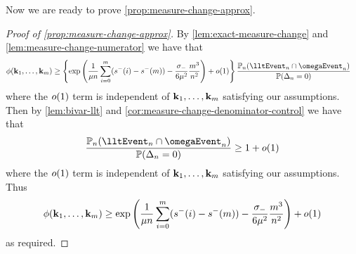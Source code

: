 Now we are ready to prove \cref{prop:measure-change-approx}.

\begin{proof}[Proof of \cref{prop:measure-change-approx}]
    By \cref{lem:exact-measure-change} and \cref{lem:measure-change-numerator} we have that
    \begin{align*}
        \phi(\vk_1, \ldots, \vk_m)
        &\geq \left\{ \exp\left(
            \frac{1}{\mu n} \sum_{i=0}^m (s^-(i) - s^-(m)) - \frac{\sigma_-}{6 \mu^2} \frac{m^3}{n^2}
        \right) + \littleo(1) \right\} \frac{\P_n(\lltEvent_n \cap \omegaEvent_n)}{\P(\Delta_n = 0)}
    \end{align*}
    where the $o(1)$ term is independent of ${\mathbf k}_1, \ldots, {\mathbf k}_m$ satisfying our assumptions. Then by \cref{lem:bivar-llt} and \cref{cor:measure-change-denominator-control} we have that
    \begin{equation*}
        \frac{\P_n(\lltEvent_n \cap \omegaEvent_n)}{\P(\Delta_n = 0)} \geq 1 + \littleo(1)
    \end{equation*}
    where the $o(1)$ term is independent of ${\mathbf k}_1, \ldots, {\mathbf k}_m$ satisfying our assumptions. Thus
    \begin{equation*}
        \phi({\mathbf k}_1, \ldots, {\mathbf k}_m) \geq
        \exp\left(
            \frac{1}{\mu n} \sum_{i=0}^m (s^-(i) - s^-(m)) - \frac{\sigma_-}{6 \mu^2} \frac{m^3}{n^2}
        \right) + o(1)
    \end{equation*}
    as required.
\end{proof}